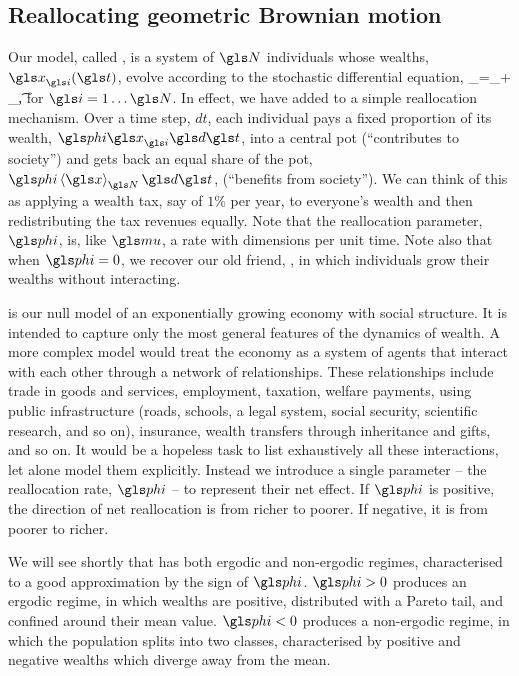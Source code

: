 \subsection{Reallocating geometric Brownian motion}
Our model, called \RGBM, is a system of $\N$ individuals whose wealths, $\x_\gi(\t)$, evolve according to the stochastic differential equation,
\be
\gd\x_\gi=\x_\gi \left[(\gmu-\gphi)\gd\t+\gsigma \gd\gW_\gi\left(\t\right)\right]+ \gphi\ave{\x}_\N\gd\t,
\ee
for $\gi=1\dots \N$. In effect, we have added to \GBM a simple reallocation mechanism. Over a time step, $dt$, each individual pays a fixed proportion of its wealth, $\gphi \x_\gi \gd\t$, into a central pot (``contributes to society'') and gets back an equal share of the pot, $\gphi\ave{\x}_\N \gd\t$, (``benefits from society''). We can think of this as applying a wealth tax, say of $1\%$ per year, to everyone's wealth and then redistributing the tax revenues equally. Note that the reallocation parameter, $\gphi$, is, like $\gmu$, a rate with dimensions per unit time. Note also that when $\gphi=0$, we recover our old friend, \GBM, in which individuals grow their wealths without interacting.

\RGBM is our null model of an exponentially growing economy with social structure. It is intended to capture only the most general features of the dynamics of wealth. A more complex model would treat the economy as a system of agents that interact with each other through a network of relationships. These relationships include trade in goods and services, employment, taxation, welfare payments, using public infrastructure (roads, schools, a legal system, social security, scientific research, and so on), insurance, wealth transfers through inheritance and gifts, and so on. It would be a hopeless task to list exhaustively all these interactions, let alone model them explicitly. Instead we introduce a single parameter -- the reallocation rate, $\gphi$ -- to represent their net effect. If $\gphi$ is positive, the direction of net reallocation is from richer to poorer. If negative, it is from poorer to richer.

We will see shortly that \RGBM has both ergodic and non-ergodic regimes, characterised to a good approximation by the sign of $\gphi$. $\gphi>0$ produces an ergodic regime, in which wealths are positive, distributed with a Pareto tail, and confined around their mean value. $\gphi<0$ produces a non-ergodic regime, in which the population splits into two classes, characterised by positive and negative wealths which diverge away from the mean.

